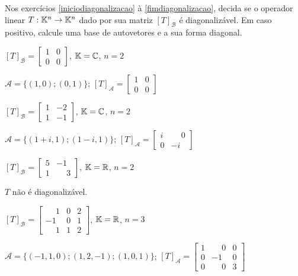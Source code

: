 \documentclass[12pt]{exam}
\begin{document}
Nos exercícios \eqref{iniciodiagonalizacao} à \eqref{fimdiagonalizacao}, decida se o operador linear $T : \mathbb{K}^n \to \mathbb{K}^n$ dado por sua matriz $[T]_\mathcal{B}$ é diagonalizável. Em caso positivo, calcule uma base de autovetores e a sua forma diagonal.

\begin{exercicio}\label{iniciodiagonalizacao}
    $[T]_\mathcal{B} = \begin{bmatrix} 1 & 0\\ 0 & 0\end{bmatrix}$, $\mathbb{K} = \mathbb{C}$, $n = 2$
    \begin{solucao}
         $\mathcal{A} = \{(1,0);(0,1)\}$; $[T]_\mathcal{A} = \begin{bmatrix} 1 & 0\\ 0 & 0\end{bmatrix}$
    \end{solucao}
\end{exercicio}

\begin{exercicio}
    $[T]_\mathcal{B} = \begin{bmatrix} 1 & -2\\ 1 & -1\end{bmatrix}$, $\mathbb{K} = \mathbb{C}$, $n = 2$

    \begin{solucao}
        $\mathcal{A} = \{(1 + i,1);(1 - i,1)\}$; $[T]_\mathcal{A} = \begin{bmatrix} i & \phantom{-} 0\\ 0 & -i\end{bmatrix}$
    \end{solucao}
\end{exercicio}

\begin{exercicio}
    $[T]_\mathcal{B} = \begin{bmatrix} 5 & -1\\ 1 & \phantom{-} 3\end{bmatrix}$, $\mathbb{K} = \mathbb{R}$, $n = 2$

    \begin{solucao}
        $T$ não é diagonalizável.
    \end{solucao}
\end{exercicio}

\begin{exercicio}
    $[T]_\mathcal{B} = \begin{bmatrix} \phantom{-} 1 & 0 & 2\\ -1 & 0 & 1\\ \phantom{-} 1 & 1 & 2\end{bmatrix}$, $\mathbb{K} = \mathbb{R}$, $n = 3$

    \begin{solucao}
        $\mathcal{A} = \{(-1,1,0);(1,2,-1);(1,0,1)\}$; $[T]_\mathcal{A} = \begin{bmatrix} 1 & \phantom{-} 0 & 0\\ 0 & -1 & 0\\0 & \phantom{-} 0 & 3\end{bmatrix}$
    \end{solucao}
\end{exercicio}
\end{document}
